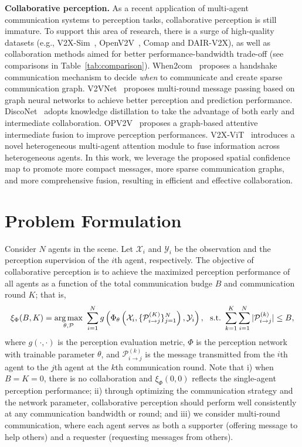 \documentclass{article}
\begin{document}
\textbf{Collaborative perception.}
As a recent application of multi-agent communication systems to perception tasks, collaborative perception is still immature. To support this area of research, there is a surge of high-quality datasets (e.g., V2X-Sim~\cite{V2XSim}, OpenV2V~\cite{OPV2V}, Comap\cite{comap} and DAIR-V2X\cite{dair}), as well as collaboration methods aimed for better performance-bandwidth trade-off (see comparisons in Table~\ref{tab:comparison}). When2com~\cite{when2com} proposes a handshake communication mechanism to decide \textit{when} to communicate and create sparse communication graph. V2VNet~\cite{v2vnet} proposes multi-round message passing based on graph neural networks to achieve better perception and prediction performance. DiscoNet~\cite{disconet} adopts knowledge distillation to take the advantage of both early and intermediate collaboration. OPV2V~\cite{OPV2V} proposes a graph-based attentive intermediate fusion to improve perception performances. V2X-ViT~\cite{xu2022v2x} introduces a novel heterogeneous multi-agent attention module to fuse information across heterogeneous agents. In this work, we leverage the proposed spatial confidence map to promote more compact messages, more sparse communication graphs, and more comprehensive fusion, resulting in efficient and effective collaboration. 
%
 \vspace{-3mm}
\section{Problem Formulation}
\label{sec:ProblemForm}
\vspace{-2mm}
Consider $N$ agents in the scene. Let $\mathcal{X}_i$ and $\mathcal{Y}_i$ be the observation and the perception supervision of the $i$th agent, respectively. The objective of collaborative perception is to achieve the maximized perception performance of all agents as a function of the total communication budge $B$ and communication round $K$; that is,
\vspace{-1mm}
\begin{equation*}
    {\xi}_{\Phi}(B, K) = \underset{\theta,\mathcal{P}}{\arg \max}~\sum_{i=1}^{N} 
    g \left(\Phi_{\theta} \left(\mathcal{X}_i,\{\mathcal{P}_{i\rightarrow j}^{(K)}\}_{j=1}^N \right), \mathcal{Y}_i  \right),~
    ~{\rm s.t.~} \sum_{k=1}^{K} \sum_{i=1}^{N}|\mathcal{P}_{i\rightarrow j}^{(k)}| \leq B,
\vspace{-1mm}
\end{equation*}
where $g(\cdot,\cdot)$ is the perception evaluation metric, $\Phi$ is the perception network with trainable parameter $\theta$, and $\mathcal{P}_{i\rightarrow j}^{(k)}$ is the message transmitted from the $i$th agent to the $j$th agent at the $k$th communication round. Note that i) when $B=K=0$, there is no collaboration and ${\xi}_{\Phi}(0, 0)$ reflects the single-agent perception performance; ii) through optimizing the communication strategy and the network parameter, collaborative perception should perform well consistently at any communication bandwidth or round; and iii) we consider multi-round communication, where each agent serves as both a supporter (offering message to help others) and a requester (requesting messages from others).
\end{document}
